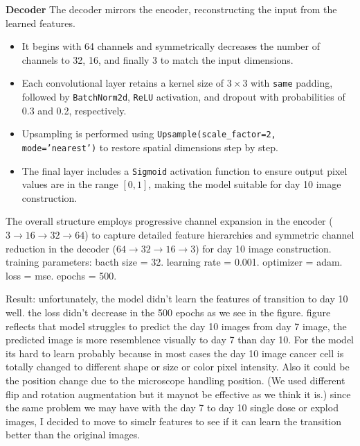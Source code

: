   \textbf{Decoder}
  The decoder mirrors the encoder, reconstructing the input from the learned features.  
  \begin{itemize}
      \item It begins with 64 channels and symmetrically decreases the number of channels to 32, 16, and finally 3 to match the input dimensions.  
      \item Each convolutional layer retains a kernel size of $3 \times 3$ with \texttt{same} padding, followed by \texttt{BatchNorm2d}, \texttt{ReLU} activation, and dropout with probabilities of 0.3 and 0.2, respectively.  
      \item Upsampling is performed using \texttt{Upsample(scale\_factor=2, mode='nearest')} to restore spatial dimensions step by step.  
      \item The final layer includes a \texttt{Sigmoid} activation function to ensure output pixel values are in the range $[0, 1]$, making the model suitable for 
      day 10 image construction.  
  \end{itemize}
  

The overall structure employs progressive channel expansion in the encoder (\(3 \to 16 \to 32 \to 64\)) to capture detailed feature hierarchies and symmetric 
channel reduction in the decoder (\(64 \to 32 \to 16 \to 3\)) for day 10 image construction. 
training parameters: bacth size = 32. learning rate = 0.001. optimizer = adam. loss = mse. epochs = 500. 



Result: 
unfortunately, the model didn't learn the features of transition to day 10 well. the loss didn't decrease in the 500 epochs as we see in the figure.  figure reflects that
model struggles to predict the day 10 images from day 7 image, the predicted image is more resemblence visually to day 7 than day 10. For the model its hard to learn probably because in most cases the day 10 image cancer cell is totally changed to different 
shape or size or color pixel intensity. Also it could be the position change due to the microscope handling position. (We used different flip and rotation 
augmentation but it maynot be effective as we think it is.) since the same problem we may have with the day 7 to day 10 single dose or explod images, I decided to move to
simclr features to see if it can learn the transition better than the original images. 

